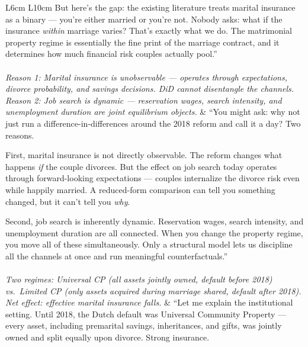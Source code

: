 \documentclass[11pt, a4paper]{article}
\begin{document}
\begin{longtable}{L{6cm} L{10cm}}
But here's the gap: the existing literature treats marital insurance as a binary — you're either married or you're not. Nobody asks: what if the insurance \emph{within} marriage varies? That's exactly what we do. The matrimonial property regime is essentially the fine print of the marriage contract, and it determines how much financial risk couples actually pool.'' \\[1em]

\\
\textit{Reason 1: Marital insurance is unobservable — operates through expectations, divorce probability, and savings decisions. DiD cannot disentangle the channels.
Reason 2: Job search is dynamic — reservation wages, search intensity, and unemployment duration are joint equilibrium objects.} &
``You might ask: why not just run a difference-in-differences around the 2018 reform and call it a day? Two reasons.

First, marital insurance is not directly observable. The reform changes what happens \emph{if} the couple divorces. But the effect on job search today operates through forward-looking expectations — couples internalize the divorce risk even while happily married. A reduced-form comparison can tell you something changed, but it can't tell you \emph{why}.

Second, job search is inherently dynamic. Reservation wages, search intensity, and unemployment duration are all connected. When you change the property regime, you move all of these simultaneously. Only a structural model lets us discipline all the channels at once and run meaningful counterfactuals.'' \\[1em]

\\
\textit{Two regimes: Universal CP (all assets jointly owned, default before 2018) vs.\ Limited CP (only assets acquired during marriage shared, default after 2018).
Net effect: effective marital insurance falls.} &
``Let me explain the institutional setting. Until 2018, the Dutch default was Universal Community Property — every asset, including premarital savings, inheritances, and gifts, was jointly owned and split equally upon divorce. Strong insurance.


\end{longtable}
\end{document}
